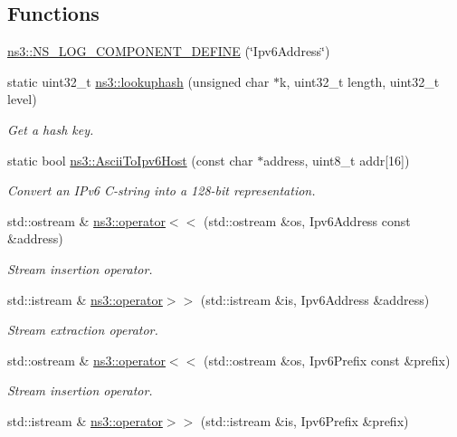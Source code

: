 \subsection*{Functions}
\begin{DoxyCompactItemize}
\item 
\hyperlink{namespacens3_a99767532315cf8d35c9bbbc02ae13613}{ns3\+::\+N\+S\+\_\+\+L\+O\+G\+\_\+\+C\+O\+M\+P\+O\+N\+E\+N\+T\+\_\+\+D\+E\+F\+I\+NE} (\char`\"{}Ipv6\+Address\char`\"{})
\item 
static uint32\+\_\+t \hyperlink{namespacens3_a9dc35ee6c77a41cca2403ad5907b1207}{ns3\+::lookuphash} (unsigned char $\ast$k, uint32\+\_\+t length, uint32\+\_\+t level)
\begin{DoxyCompactList}\small\item\em Get a hash key. \end{DoxyCompactList}\item 
static bool \hyperlink{namespacens3_aba8266b47e04689cbaa4d1c34e68fedf}{ns3\+::\+Ascii\+To\+Ipv6\+Host} (const char $\ast$address, uint8\+\_\+t addr\mbox{[}16\mbox{]})
\begin{DoxyCompactList}\small\item\em Convert an I\+Pv6 C-\/string into a 128-\/bit representation. \end{DoxyCompactList}\item 
std\+::ostream \& \hyperlink{namespacens3_a9280986a3c66a7fe122a524ee969a8e9}{ns3\+::operator$<$$<$} (std\+::ostream \&os, Ipv6\+Address const \&address)
\begin{DoxyCompactList}\small\item\em Stream insertion operator. \end{DoxyCompactList}\item 
std\+::istream \& \hyperlink{namespacens3_a455756db8536b9ad4d841cce1dcc076a}{ns3\+::operator$>$$>$} (std\+::istream \&is, Ipv6\+Address \&address)
\begin{DoxyCompactList}\small\item\em Stream extraction operator. \end{DoxyCompactList}\item 
std\+::ostream \& \hyperlink{namespacens3_a00b3b8b7c1aeb9e8872fd8263198d9c7}{ns3\+::operator$<$$<$} (std\+::ostream \&os, Ipv6\+Prefix const \&prefix)
\begin{DoxyCompactList}\small\item\em Stream insertion operator. \end{DoxyCompactList}\item 
std\+::istream \& \hyperlink{namespacens3_aa2dd0769f4fe39347bc4ce72c5554b49}{ns3\+::operator$>$$>$} (std\+::istream \&is, Ipv6\+Prefix \&prefix)

\end{DoxyCompactItemize}
